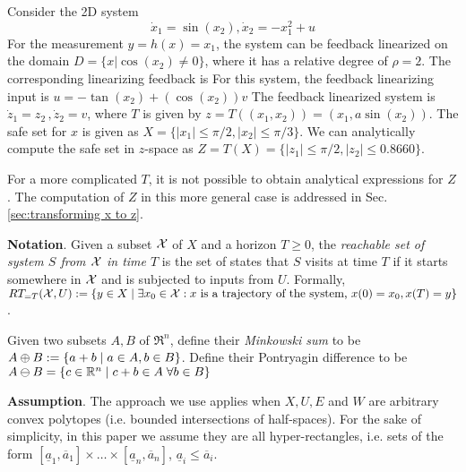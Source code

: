 \begin{exmp}
	Consider the 2D system 
	\begin{equation}
	\label{eq:toy_dynamics}
	\dot{x}_1 = \sin(x_2) , \dot{x}_2 =-x_1^2 + u 
	\end{equation}
	For the measurement $y = h(x) = x_1$, the system can be feedback linearized on the domain $D = \lbrace x | \cos(x_2) \neq 0 \rbrace $, where it has a relative degree of $\rho=2$. 
	The corresponding linearizing feedback is For this system, the feedback linearizing input is $u = -\tan(x_2) + (\cos(x_2))v$
	The feedback linearized system is $\dot{z}_1 = z_2\, ,\dot{z}_2 = v$, where $T$ is given by $z=T((x_1,x_2)) = (x_1, a\sin(x_2))$.	
	The safe set for $x$ is given as $X = \lbrace |x_1| \leq \pi /2, |x_2| \leq \pi/3 \rbrace$. 
	We can analytically compute the safe set in $z$-space as $Z = T(X) =  \lbrace |z_1| \leq \pi /2, |z_2| \leq 0.8660\rbrace$.
	\exmend
\end{exmp}

For a more complicated $T$, it is not possible to obtain analytical expressions for $Z$. 
The computation of $Z$ in this more general case is addressed in Sec. \ref{sec:transforming x to z}.

\textbf{Notation}.
Given a subset $\mathcal{X}$ of $X$ and a horizon $T \geq 0$, the \emph{reachable set of system $S$ from $\mathcal{X}$ in time $T$} is the set of states that $S$ visits at time $T$ if it starts somewhere in $\mathcal{X}$ and is subjected to inputs from $U$.
Formally, $RT_{=T}(\mathcal{X},U) := \{y \in X \;|\; \exists x_0 \in \mathcal{X}: x \text{ is a trajectory of the system, }x(0)=x_0, x(T)=y\}$.

Given two subsets $A,B$ of $\Re^n$, define their \textit{Minkowski sum} to be $A\oplus B := \{a+b \;|\; a\in A, b\in B\}$.
Define their Pontryagin difference to be $A\ominus B = \{c \in \mathbb{R}^n \;|\; c+b \in A\; \forall b \in B\}$

\textbf{Assumption}. 
The approach we use applies when $X, U, E$ and $W$ are arbitrary convex polytopes (i.e. bounded intersections of half-spaces).
For the sake of simplicity, in this paper we assume they are all hyper-rectangles, i.e. sets of the form $[\underline{a}_1, \overline{a}_1] \times \ldots \times  [\underline{a}_n, \overline{a}_n]$, $\underline{a}_i \leq \overline{a}_i$.